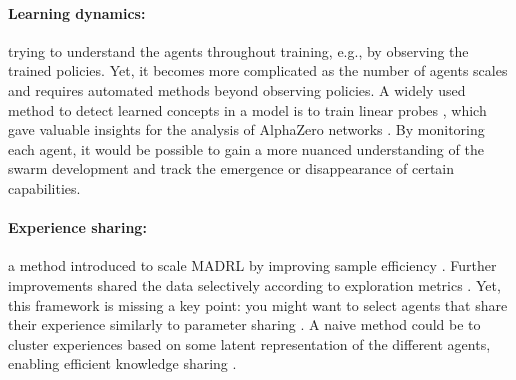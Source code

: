\paragraph{Learning dynamics:} trying to understand the agents throughout training, e.g., by observing the trained policies. Yet, it becomes more complicated as the number of agents scales and requires automated methods beyond observing policies. A widely used method to detect learned concepts in a model is to train linear probes
\cite{alain2018understanding}, which gave valuable insights for the analysis of AlphaZero networks \cite{McGrath_2022}.
By monitoring each agent, it would be possible to gain a more nuanced understanding of the swarm development and track the emergence or disappearance of certain capabilities. 


\paragraph{Experience sharing:} a method introduced to scale MADRL by improving sample efficiency \cite{Christianos2020SharedEA}. Further improvements shared the data selectively according to exploration metrics \cite{Gerstgrasser2023SelectivelySE}. Yet, this framework is missing a key point: you might want to select agents that share their experience similarly to parameter sharing \cite{Christianos2021ScalingMR}. A naive method could be to cluster experiences based on some latent representation of the different agents, enabling efficient knowledge sharing \cite{zou2023representation}.



